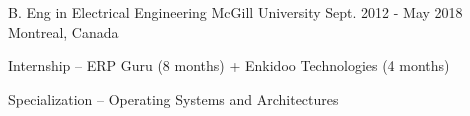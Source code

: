 

\begin{cventries}

  \cventry
    {B. Eng in Electrical Engineering} %
    {McGill University} %
    {Sept. 2012 - May 2018} %
    {Montreal, Canada} %
    {
      \begin{cvitems} %
        \item {Internship – ERP Guru (8 months) + Enkidoo Technologies (4 months)}
        \item {Specialization – Operating Systems and Architectures}
      \end{cvitems}
    }

\end{cventries}
